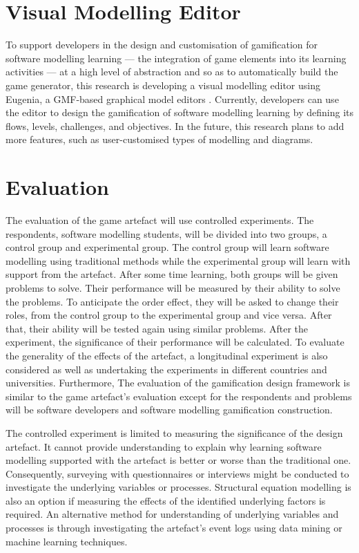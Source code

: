 \documentclass[runningheads,a4paper]{llncs}
\begin{document}
\section{Visual Modelling Editor}
To support developers in the design and customisation of gamification for software modelling learning --- the integration of game elements into its learning activities --- at a high level of abstraction and so as to automatically build the game generator, this research is developing a visual modelling editor using Eugenia, a GMF-based graphical model editors \cite{kolovos2015eugenia}. Currently, developers can use the editor to design the gamification of software modelling learning by defining its flows, levels, challenges, and objectives. In the future, this research plans to add more features, such as user-customised types of modelling and diagrams. 

\section{Evaluation}
The evaluation of the game artefact will use controlled experiments. The respondents, software modelling students, will be divided into two groups, a control group and experimental group. The control group will learn software modelling using traditional methods while the experimental group will learn with support from the artefact. After some time learning, both groups will be given problems to solve. Their performance will be measured by their ability to solve the problems. To anticipate the order effect, they will be asked to change their roles, from the control group to the experimental group and vice versa. After that, their ability will be tested again using similar problems. After the experiment, the significance of their performance will be calculated. To evaluate the generality of the effects of the artefact, a longitudinal experiment is also considered as well as undertaking the experiments in different countries and universities. Furthermore, The evaluation of the gamification design framework is similar to the game artefact's evaluation except for the respondents and problems will be software developers and software modelling gamification construction.

The controlled experiment is limited  to measuring the significance of the design artefact.  It cannot provide understanding to explain why learning software modelling supported with the artefact is better or worse than the traditional one. Consequently, surveying with questionnaires or interviews might be conducted to investigate the underlying variables or processes. Structural equation modelling \cite{hair2016primer} is also an option if measuring the effects of the identified underlying factors is required.  An alternative method for understanding of underlying variables and processes is through investigating the artefact's event logs using data mining or machine learning techniques.
\end{document}
